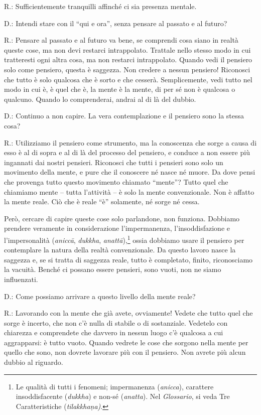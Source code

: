 R.: Sufficientemente tranquilli affinché ci sia presenza mentale.

D.: Intendi stare con il ``qui e ora'', senza pensare al passato e al
futuro?

R.: Pensare al passato e al futuro va bene, se comprendi cosa siano in
realtà queste cose, ma non devi restarci intrappolato. Trattale nello
stesso modo in cui tratteresti ogni altra cosa, ma non restarci
intrappolato. Quando vedi il pensiero solo come pensiero, questa è
saggezza. Non credere a nessun pensiero! Riconosci che tutto è solo
qualcosa che è sorto e che cesserà. Semplicemente, vedi tutto nel modo
in cui è, è quel che è, la mente è la mente, di per sé non è qualcosa o
qualcuno. Quando lo comprenderai, andrai al di là del dubbio.

D.: Continuo a non capire. La vera contemplazione e il pensiero sono la
stessa cosa?

R.: Utilizziamo il pensiero come strumento, ma la conoscenza che sorge a
causa di esso è al di sopra e al di là del processo del pensiero, e
conduce a non essere più ingannati dai nostri pensieri. Riconosci che
tutti i pensieri sono solo un movimento della mente, e pure che il
conoscere né nasce né muore. Da dove pensi che provenga tutto questo
movimento chiamato ``mente''? Tutto quel che chiamiamo mente -- tutta
l'attività -- è solo la mente convenzionale. Non è affatto la mente
reale. Ciò che è reale ``è'' solamente, né sorge né cessa.

Però, cercare di capire queste cose solo parlandone, non funziona.
Dobbiamo prendere veramente in considerazione l'impermanenza,
l'insoddisfazione e l'impersonalità (\emph{aniccā}, \emph{dukkha},
\emph{anattā}),\footnote{Le qualità di tutti i fenomeni; impermanenza
  (\emph{anicca}), carattere insoddisfacente (\emph{dukkha}) e non-sé
  (\emph{anatta}). Nel \emph{Glossario}, si veda Tre Caratteristiche
  (\emph{tilakkhaṇa)}.} ossia dobbiamo usare il pensiero per contemplare
la natura della realtà convenzionale. Da questo lavoro nasce la saggezza
e, se si tratta di saggezza reale, tutto è completato, finito,
riconosciamo la vacuità. Benché ci possano essere pensieri, sono vuoti,
non ne siamo influenzati.

D.: Come possiamo arrivare a questo livello della mente reale?

R.: Lavorando con la mente che già avete, ovviamente! Vedete che tutto
quel che sorge è incerto, che non c'è nulla di stabile o di sostanziale.
Vedetelo con chiarezza e comprendete che davvero in nessun luogo c'è
qualcosa a cui aggrapparsi: è tutto vuoto. Quando vedrete le cose che
sorgono nella mente per quello che sono, non dovrete lavorare più con il
pensiero. Non avrete più alcun dubbio al riguardo.

